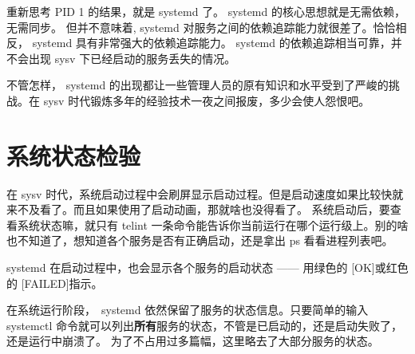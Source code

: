 重新思考 PID 1 的结果，就是 systemd 了。 systemd 的核心思想就是无需依赖，无需同步。
但并不意味着, systemd 对服务之间的依赖追踪能力就很差了。恰恰相反， systemd 具有非常强大的依赖追踪能力。
systemd 的依赖追踪相当可靠，并不会出现 sysv 下已经启动的服务丢失的情况。

不管怎样， systemd 的出现都让一些管理人员的原有知识和水平受到了严峻的挑战。在 sysv 时代锻炼多年的经验技术一夜之间报废，多少会使人怨恨吧。

\section{系统状态检验}
在 sysv 时代，系统启动过程中会刷屏显示启动过程。但是启动速度如果比较快就来不及看了。而且如果使用了启动动画，那就啥也没得看了。
系统启动后，要查看系统状态嘛，就只有 telint 一条命令能告诉你当前运行在哪个运行级上。别的啥也不知道了，想知道各个服务是否有正确启动，还是拿出 ps 看看进程列表吧。

systemd 在启动过程中，也会显示各个服务的启动状态 ——  用绿色的 {\color{green} [OK]}或红色的 {\color{red}[FAILED]}指示。

在系统运行阶段，　systemd 依然保留了服务的状态信息。只要简单的输入　systemctl 命令就可以列出\textbf{所有}服务的状态，不管是已启动的，还是启动失败了，还是运行中崩溃了。
为了不占用过多篇幅，这里略去了大部分服务的状态。


